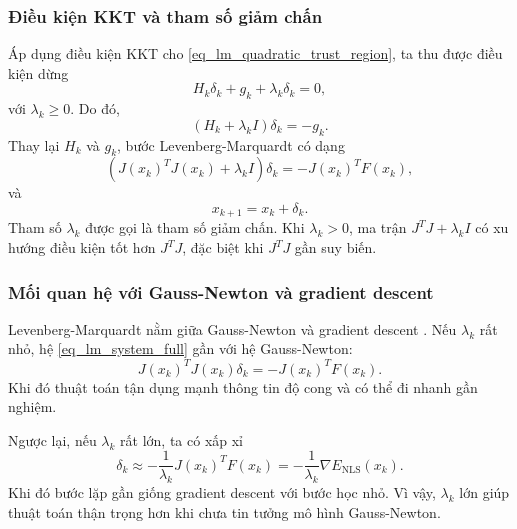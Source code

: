 \subsubsection*{Điều kiện KKT và tham số giảm chấn}
Áp dụng điều kiện KKT cho \eqref{eq_lm_quadratic_trust_region}, ta thu được điều kiện dừng
\begin{equation}
    H_k\delta_k+g_k+\lambda_k\delta_k=0,
    \label{eq_lm_stationarity}
\end{equation}
với $\lambda_k\geq 0$. Do đó,
\begin{equation}
    \left(H_k+\lambda_k I\right)\delta_k=-g_k.
    \label{eq_lm_linear_system}
\end{equation}
Thay lại $H_k$ và $g_k$, bước Levenberg-Marquardt có dạng
\begin{equation}
    \left(J(x_k)^{T}J(x_k)+\lambda_k I\right)\delta_k
    =-J(x_k)^{T}F(x_k),
    \label{eq_lm_system_full}
\end{equation}
và
\begin{equation}
    x_{k+1}=x_k+\delta_k.
    \label{eq_lm_update}
\end{equation}
Tham số $\lambda_k$ được gọi là tham số giảm chấn. Khi $\lambda_k>0$, ma trận $J^{T}J+\lambda_k I$ có xu hướng điều kiện tốt hơn $J^{T}J$, đặc biệt khi $J^{T}J$ gần suy biến.

\subsubsection*{Mối quan hệ với Gauss-Newton và gradient descent}
Levenberg-Marquardt nằm giữa Gauss-Newton và gradient descent \cite{Levenberg1944,Marquardt1963}. Nếu $\lambda_k$ rất nhỏ, hệ \eqref{eq_lm_system_full} gần với hệ Gauss-Newton:
\begin{equation}
    J(x_k)^{T}J(x_k)\delta_k=-J(x_k)^{T}F(x_k).
    \label{eq_lm_to_gn}
\end{equation}
Khi đó thuật toán tận dụng mạnh thông tin độ cong và có thể đi nhanh gần nghiệm.
\medskip

Ngược lại, nếu $\lambda_k$ rất lớn, ta có xấp xỉ
\begin{equation}
    \delta_k\approx -\frac{1}{\lambda_k}J(x_k)^{T}F(x_k)
    =-\frac{1}{\lambda_k}\nabla E_{\mathrm{NLS}}(x_k).
    \label{eq_lm_to_gradient}
\end{equation}
Khi đó bước lặp gần giống gradient descent với bước học nhỏ. Vì vậy, $\lambda_k$ lớn giúp thuật toán thận trọng hơn khi chưa tin tưởng mô hình Gauss-Newton.

